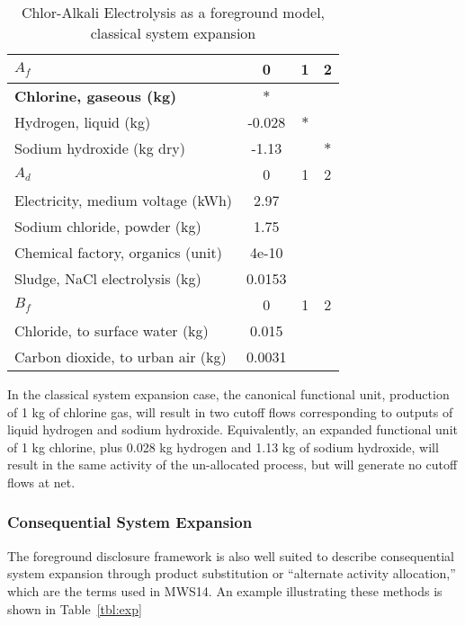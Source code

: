 \begin{table}[h]
  \begin{center}
  \caption{Chlor-Alkali Electrolysis as a foreground model, classical system expansion}
  \label{tbl:cse}
  \footnotesize\sffamily
  \begin{tabular}{l|ccc}
    \midrule
    \bf $A_f$ & 0 & 1 & 2 \\
    \midrule
    \textbf{Chlorine, gaseous (kg)} & $\ast$ & & \\
    Hydrogen, liquid (kg) & -0.028 & $\ast$ & \\
    Sodium hydroxide (kg dry) & -1.13 & & $\ast$ \\
    \midrule
    \bf $A_d$ & 0 & 1 & 2 \\
    \midrule
    Electricity, medium voltage (kWh) & 2.97 &  &  \\
    Sodium chloride, powder (kg) & 1.75 &  & \\
    Chemical factory, organics (unit) & 4e-10 &  &  \\
    Sludge, NaCl electrolysis (kg) & 0.0153 &  &  \\
    \midrule
    \bf $B_f$ & 0 & 1 & 2 \\
    \midrule
    Chloride, to surface water (kg) & 0.015 &  &  \\
    Carbon dioxide, to urban air (kg) & 0.0031 &  &  \\
    \midrule
  \end{tabular}
  \end{center}
\end{table}

In the classical system expansion case, the canonical functional unit, production of 1 kg of chlorine gas, will result in two cutoff flows corresponding to outputs of liquid hydrogen and sodium hydroxide.  Equivalently, an expanded functional unit of 1 kg chlorine, plus 0.028 kg hydrogen and 1.13 kg of sodium hydroxide, will result in the same activity of the un-allocated process, but will generate no cutoff flows at net.

\subsubsection{Consequential System Expansion}

The foreground disclosure framework is also well suited to describe consequential system expansion through product substitution or ``alternate activity allocation,'' which are the terms used in MWS14.  An example illustrating these methods is shown in Table~\ref{tbl:exp}

